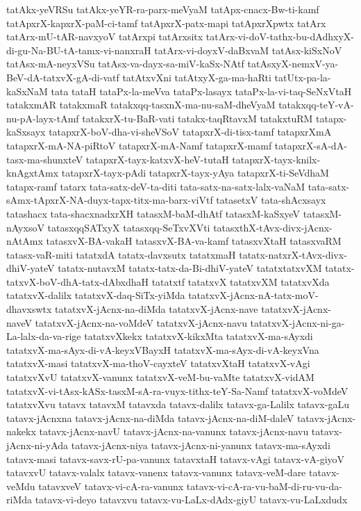 {tatAkx-yeVRSu
tatAkx-yeYR-ra-parx-meVyaM
tatApx-cnacx-Bw-ti-kamf
tatApxrX-kapxrX-paM-ci-tamf
tatApxrX-patx-mapi
tatApxrXpwtx
tatArx
tatArx-mU-tAR-navxyoV
tatArxpi
tatArxsitx
tatArx-vi-doV-tathx-bu-dAdhxyX-di-gu-Na-BU-tA-tamx-vi-nanxraH
tatArx-vi-doyxV-daBxvaM
tatAsx-kiSxNoV
tatAsx-mA-neyxVSu
tatAsx-va-dayx-sa-miV-kaSx-NAtf
tatAsxyX-nemxV-ya-BeV-dA-tatxvX-gA-di-vatf
tatAtxvXni
tatAtxyX-ga-ma-haRti
tatUtx-pa-la-kaSxNaM
tata
tataH
tataPx-la-meVva
tataPx-lasayx
tataPx-la-vi-taq-SeNxVtaH
tatakxmAR
tatakxmaR
tatakxqq-tasxnX-ma-nu-saM-dheVyaM
tatakxqq-teY-vA-nu-pA-layx-tAmf
tatakxrX-tu-BaR-vati
tatakx-taqRtavxM
tatakxtuRM
tatapx-kaSxsayx
tatapxrX-boV-dha-vi-sheVSoV
tatapxrX-di-tisx-tamf
tatapxrXmA
tatapxrX-mA-NA-piRtoV
tatapxrX-mA-Namf
tatapxrX-mamf
tatapxrX-sA-dA-tasx-ma-shunxteV
tatapxrX-tayx-katxvX-heV-tutaH
tatapxrX-tayx-knilx-knAgxtAmx
tatapxrX-tayx-pAdi
tatapxrX-tayx-yAya
tatapxrX-ti-SeVdhaM
tatapx-ramf
tatarx
tata-satx-deV-ta-diti
tata-satx-na-satx-lalx-vaNaM
tata-satx-sAmx-tApxrX-NA-duyx-tapx-titx-ma-barx-viVtf
tatasetxV
tata-shAcxsayx
tatashacx
tata-shacxnadxrXH
tatasxM-baM-dhAtf
tatasxM-kaSxyeV
tatasxM-nAyxsoV
tatasxqqSATxyX
tatasxqq-SeTxvXVti
tatasxthX-tAvx-divx-jAcnx-nAtAmx
tatasxvX-BA-vakaH
tatasxvX-BA-va-kamf
tatasxvXtaH
tatasxvaRM
tatasx-vaR-miti
tatatxdA
tatatx-davxsutx
tatatxmaH
tatatx-natxrX-tAvx-divx-dhiV-yateV
tatatx-nutavxM
tatatx-tatx-da-Bi-dhiV-yateV
tatatxtatxvXM
tatatx-tatxvX-boV-dhA-tatx-dAbxdhaH
tatatxtf
tatatxvX
tatatxvXM
tatatxvXda
tatatxvX-dalilx
tatatxvX-daq-SiTx-yiMda
tatatxvX-jAcnx-nA-tatx-moV-dhavxswtx
tatatxvX-jAcnx-na-diMda
tatatxvX-jAcnx-nave
tatatxvX-jAcnx-naveV
tatatxvX-jAcnx-na-voMdeV
tatatxvX-jAcnx-navu
tatatxvX-jAcnx-ni-ga-La-lalx-da-va-rige
tatatxvXkekx
tatatxvX-kikxMta
tatatxvX-ma-sAyxdi
tatatxvX-ma-sAyx-di-vA-keyxVBayxH
tatatxvX-ma-sAyx-di-vA-keyxVna
tatatxvX-masi
tatatxvX-ma-thoV-cayxteV
tatatxvXtaH
tatatxvX-vAgi
tatatxvXvU
tatatxvX-vanunx
tatatxvX-veM-bu-vaMte
tatatxvX-vidAM
tatatxvX-vi-tAsx-kASx-tasxM-sA-ra-vuyx-tithx-teY-Sa-Namf
tatatxvX-voMdeV
tatatxvXvu
tatavx
tatavxM
tatavxda
tatavx-dalilx
tatavx-ga-Lalilx
tatavx-gaLu
tatavx-jAcnxna
tatavx-jAcnx-na-diMda
tatavx-jAcnx-na-diM-daleV
tatavx-jAcnx-nakekx
tatavx-jAcnx-navU
tatavx-jAcnx-na-vanunx
tatavx-jAcnx-navu
tatavx-jAcnx-ni-yAda
tatavx-jAcnx-niya
tatavx-jAcnx-ni-yanunx
tatavx-ma-sAyxdi
tatavx-masi
tatavx-savx-rU-pa-vanunx
tatavxtaH
tatavx-vAgi
tatavx-vA-giyoV
tatavxvU
tatavx-valalx
tatavx-vanenx
tatavx-vanunx
tatavx-veM-dare
tatavx-veMdu
tatavxveV
tatavx-vi-cA-ra-vanunx
tatavx-vi-cA-ra-vu-baM-di-ru-vu-da-riMda
tatavx-vi-deyo
tatavxvu
tatavx-vu-LaLx-dAdx-giyU
tatavx-vu-LaLxdudx
}
